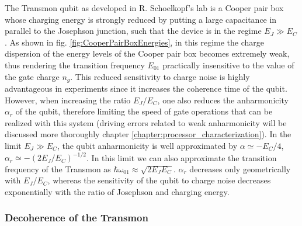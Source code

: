 The Transmon qubit as developed in R. Schoelkopf's lab \cite{koch_charge-insensitive_2007,wallraff_strong_2004} is a Cooper pair box whose charging energy is strongly reduced by putting a large capacitance in parallel to the Josephson junction, such that the device is in the regime $E_J\gg E_C$. As shown in fig. \ref{fig:CooperPairBoxEnergies}, in this regime the charge dispersion of the energy levels of the Cooper pair box becomes extremely weak, thus rendering the transition frequency $E_{01}$ practically insensitive to the value of the gate charge $n_g$. This reduced sensitivity to charge noise is highly advantageous in experiments since it increases the coherence time of the qubit. However, when increasing the ratio $E_J/E_C$, one also reduces the anharmonicity $\alpha_r$ of the qubit, therefore limiting the speed of gate operations that can be realized with this system (driving errors related to weak anharmonicity will be discussed more thoroughly chapter \ref{chapter:processor_characterization}). In the limit $E_J \gg E_C$, the qubit anharmonicity is well approximated by $\alpha \simeq -E_C/4$, $\alpha_r \simeq -(2 E_J / E_C)^{-1/2}$. In this limit we can also approximate the transition frequency of the Transmon as $\hbar\omega_{01}\approx \sqrt{2E_J E_C}$. $\alpha_r$ decreases only geometrically with $E_J/E_C$, whereas the sensitivity of the qubit to charge noise decreases exponentially with the ratio of Josephson and charging energy.

\subsubsection{Decoherence of the Transmon} \label{section:decoherence_of_the_transmon}

